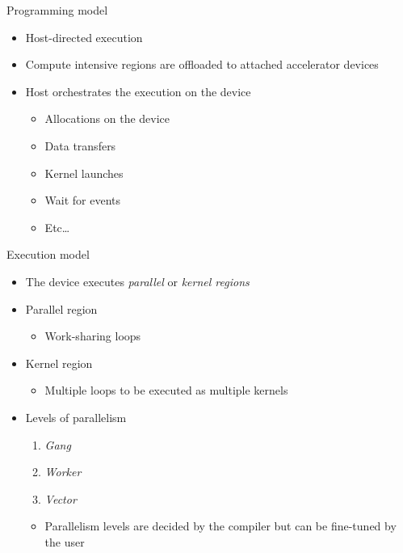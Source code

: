 \documentclass[12pt,aspectratio=169]{beamer}
\begin{document}
\begin{frame}{Programming model}
  \begin{itemize}
  \item Host-directed execution
  \item Compute intensive regions are offloaded to attached accelerator devices
  \item Host orchestrates the execution on the device
    \begin{itemize}
    \item Allocations on the device
    \item Data transfers
    \item Kernel launches
    \item Wait for events
    \item Etc\dots
    \end{itemize}
  \end{itemize}
\end{frame}

\begin{frame}{Execution model}
  \begin{itemize}
  \item The device executes \emph{parallel} or \emph{kernel regions}
  \item Parallel region
    \begin{itemize}
    \item Work-sharing loops
    \end{itemize}
  \item Kernel region
    \begin{itemize}
    \item Multiple loops to be executed as multiple kernels
    \end{itemize}
  \item Levels of parallelism
    \begin{enumerate}
    \item \emph{Gang} 
    \item \emph{Worker} 
    \item \emph{Vector} 
    \end{enumerate}
    \begin{itemize}
    \item Parallelism levels are decided by the compiler but can be fine-tuned by
      the user
    \end{itemize}
  \end{itemize}
\end{frame}
\end{document}

